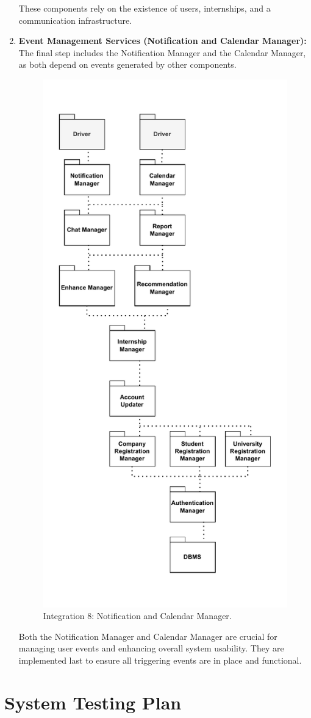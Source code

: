 \begin{enumerate}
These components rely on the existence of users, internships, and a communication infrastructure.
\newpage
    \item 
\textbf{Event Management Services (Notification and Calendar Manager):} \\
The final step includes the Notification Manager and the Calendar Manager, as both depend on events generated by other components.

\begin{figure}[H]
    \centering
    \includegraphics[width=0.5\linewidth]{DD/Images/Testing/8_NotCal.drawio.pdf}
    \caption{Integration 8: Notification and Calendar Manager.}
    \label{fig:integration_8}
\end{figure}

Both the Notification Manager and Calendar Manager are crucial for managing user events and enhancing overall system usability. They are implemented last to ensure all triggering events are in place and functional.
\end{enumerate}

\section{System Testing Plan}

